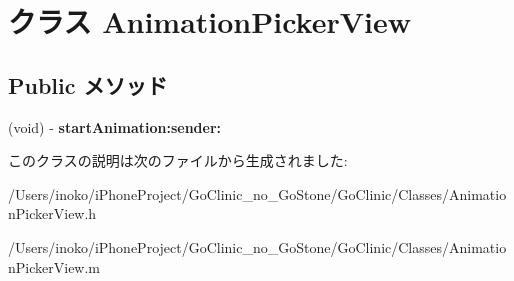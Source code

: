 \hypertarget{interface_animation_picker_view}{
\section{クラス AnimationPickerView}
\label{interface_animation_picker_view}
}
\subsection*{Public メソッド}
\begin{DoxyCompactItemize}
\item 
\hypertarget{interface_animation_picker_view_a5c09753fdd4eb569ed6001a9e4ab9db1}{
(void) -\/ {\bfseries startAnimation:sender:}}
\label{interface_animation_picker_view_a5c09753fdd4eb569ed6001a9e4ab9db1}

\end{DoxyCompactItemize}


このクラスの説明は次のファイルから生成されました:\begin{DoxyCompactItemize}
\item 
/Users/inoko/iPhoneProject/GoClinic\_\-no\_\-GoStone/GoClinic/Classes/AnimationPickerView.h\item 
/Users/inoko/iPhoneProject/GoClinic\_\-no\_\-GoStone/GoClinic/Classes/AnimationPickerView.m\end{DoxyCompactItemize}
